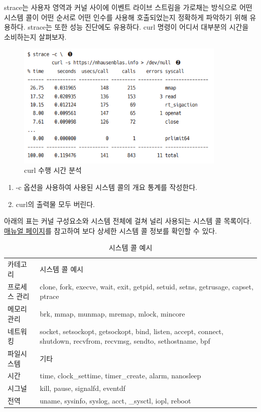 \begin{flushleft}
    strace는 사용자 영역과 커널 사이에 이벤트 라이브 스트림을 가로채는 방식으로
    어떤 시스템 콜이 어떤 순서로 어떤 인수를 사용해 호출되었는지 정확하게 파악하기 위해 유용하다.
    strace는 또한 성능 진단에도 유용하다. curl 명령이 어디서 대부분의 시간을 소비하는지 살펴보자.
\end{flushleft}

\begin{figure}
    \centering
    \includegraphics[width=10cm]{resource/strace-example2.png}
    \caption{curl 수행 시간 분석}
\end{figure}

\begin{enumerate}
    \item -c 옵션을 사용하여 사용된 시스템 콜의 개요 통계를 작성한다.
    \item curl의 출력물 모두 버린다.
\end{enumerate}

\begin{flushleft}
    아래의 표는 커널 구성요소와 시스템 전체에 걸쳐 널리 사용되는 시스템 콜 목록이다.
    \href{https://www.man7.org/linux/man-pages/dir_section_2.html}{매뉴얼 페이지}를 참고하여 보다 상세한 시스템 콜 정보를 확인할 수 있다. 
\end{flushleft}

\begin{table}[H]
    \everyrow{\hline}
    \begin{tabu}{|X[1]|X[4]|}
        카테고리 & 시스템 콜 예시 \\
        프로세스 관리 & clone, fork, execve, wait, exit, getpid, 
                            setuid, setns, getrusage, capset, ptrace \\
        메모리 관리 & brk, mmap, munmap, mremap, mlock, mincore \\
        네트워킹 & socket, setsockopt, getsockopt, bind, listen,
                        accept, connect, shutdown, recvfrom, recvmsg,
                        sendto, sethostname, bpf \\ 
        파일시스템 & 기타 \\ 
        시간 & time, clock\_settime, timer\_create, alarm, nanosleep \\ 
        시그널 & kill, pause, signalfd, eventdf \\ 
        전역 & uname, sysinfo, syslog, acct, \_sysctl, iopl, reboot \\
    \end{tabu}
    \caption{시스템 콜 예시}
\end{table}
\newpage

